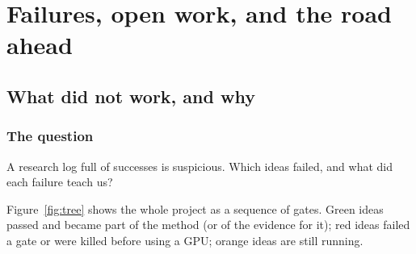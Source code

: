 \documentclass[11pt,openany]{book}
\newcommand{\qsec}{\section*{The question}}
\begin{document}
\part{Failures, open work, and the road ahead}

\chapter{What did not work, and why}\label{ch:failures}

\qsec
A research log full of successes is suspicious. Which ideas failed, and what did each failure teach us?

Figure~\ref{fig:tree} shows the whole project as a sequence of gates. Green ideas passed and became part of the method (or of the
evidence for it); red ideas failed a gate or were killed before using a GPU; orange ideas are still running.
\end{document}
